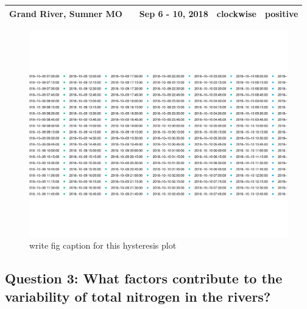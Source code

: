 \documentclass[12pt,]{article}
\begin{document}
\begin{longtable}[]{@{}lclll@{}}
\begin{minipage}[t]{0.15\columnwidth}
Grand River, Sumner MO\strut
\end{minipage} & \begin{minipage}[t]{0.22\columnwidth}\centering
06902000\strut
\end{minipage} & \begin{minipage}[t]{0.20\columnwidth}\raggedright
Sep 6 - 10, 2018\strut
\end{minipage} & \begin{minipage}[t]{0.17\columnwidth}\raggedright
clockwise\strut
\end{minipage} & \begin{minipage}[t]{0.12\columnwidth}\raggedright
positive\strut
\end{minipage}\tabularnewline
\bottomrule
\end{longtable}

\begin{figure}
\centering
\includegraphics{Missouri-Reasearch-Project---FINAL_files/figure-latex/unnamed-chunk-2-1.pdf}
\caption{write fig caption for this hysteresis plot}
\end{figure}

\hypertarget{question-3-what-factors-contribute-to-the-variability-of-total-nitrogen-in-the-rivers}{%
\subsection{Question 3: What factors contribute to the variability of
total nitrogen in the
rivers?}\label{question-3-what-factors-contribute-to-the-variability-of-total-nitrogen-in-the-rivers}}
\end{document}
